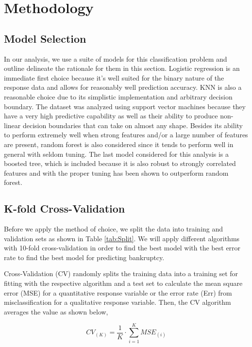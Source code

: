 \documentclass[12pt]{report}
\begin{document}
\begingroup
\renewcommand{\cleardoublepage}{}
\renewcommand{\clearpage}{}

\chapter{Methodology} %
\endgroup

\section{Model Selection}

In our analysis, we use a suite of models for this classification problem and outline delineate the rationale for them in this section. Logistic regression is an immediate first choice because it's well suited for the binary nature of the response data and allows for reasonably well prediction accuracy. KNN is also a reasonable choice due to its simplistic implementation and arbitrary decision boundary. The dataset was analyzed using support vector machines because they have a very high predictive capability as well as their ability to produce non-linear decision boundaries that can take on almost any shape. Besides its ability to perform extremely well when strong features and/or a large number of features are present, random forest is also considered since it tends to perform well in general with seldom tuning. The last model considered for this analysis is a boosted tree, which is included because it is also robust to strongly correlated features and with the proper tuning has been shown to outperform random forest. 


\section{K-fold Cross-Validation}
Before we apply the method of choice, we split the data into training and validation sets as shown in Table \ref{tab:Split}. We will apply different algorithms with 10-fold cross-validation in order to find the best model with the best error rate to find the best model for predicting bankruptcy.

Cross-Validation (CV) randomly splits the training data into a training set for fitting with the respective algorithm and a test set to calculate the mean square error (MSE) for a quantitative response variable or the error rate (Err) from misclassification for a qualitative response variable. Then, the CV algorithm averages the value as shown below,

\begin{equation}
    CV_{(K)} = \frac{1}{K}\cdot\sum^{K}_{i=1}MSE_{(i)}
\end{equation}
\end{document}
